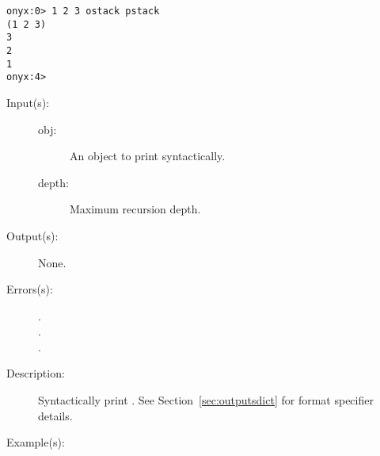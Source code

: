 \begin{description}
\begin{description}
\begin{verbatim}
onyx:0> 1 2 3 ostack pstack
(1 2 3)
3
2
1
onyx:4>
		\end{verbatim}
	\end{description}
\label{systemdict:output}
\item[{\onyxop{obj depth}{output}{--}}: ]
	\begin{description}\item[]
	\item[Input(s): ]
		\begin{description}\item[]
		\item[obj: ]
			An object to print syntactically.
		\item[depth: ]
			Maximum recursion depth.
		\end{description}
	\item[Output(s): ] None.
	\item[Errors(s): ]
		\begin{description}\item[]
		\item[.]
		\item[.]
		\item[.]
		\end{description}
	\item[Description: ]
		Syntactically print .  See
		Section~\ref{sec:outputsdict} for format specifier details.
	\item[Example(s): ]\begin{verbatim}


\end{verbatim}
\end{description}
\end{description}
